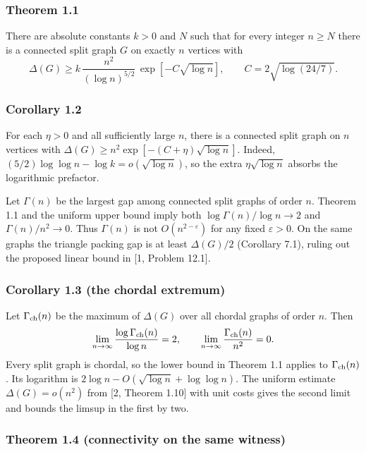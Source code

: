 \documentclass[english,11pt,a4paper]{article}
\begin{document}
\subsubsection{Theorem 1.1}\label{theorem-1.1}

There are absolute constants \(k>0\) and \(N\) such that for every integer \(n\ge N\) there is a connected split graph \(G\) on exactly \(n\) vertices with
\[\Delta(G)\ge k\,\frac{n^2}{(\log n)^{5/2}}\,\exp[-C\sqrt{\log n}],
\qquad C=2\sqrt{\log(24/7)}.\]

\subsubsection{Corollary 1.2}\label{corollary-1.2}

For each \(\eta>0\) and all sufficiently large \(n\), there is a connected split graph on \(n\) vertices with \(\Delta(G)\ge n^2\exp[-(C+\eta)\sqrt{\log n}]\). Indeed, \((5/2)\log\log n-\log k=o(\sqrt{\log n})\), so the extra \(\eta\sqrt{\log n}\) absorbs the logarithmic prefactor.

Let \(\Gamma(n)\) be the largest gap among connected split graphs of order \(n\). Theorem 1.1 and the uniform upper bound imply both \(\log\Gamma(n)/\log n\to2\) and \(\Gamma(n)/n^2\to0\). Thus \(\Gamma(n)\) is not \(O(n^{2-\varepsilon})\) for any fixed \(\varepsilon>0\). On the same graphs the triangle packing gap is at least \(\Delta(G)/2\) (Corollary 7.1), ruling out the proposed linear bound in {[}1, Problem 12.1{]}.

\subsubsection{Corollary 1.3 (the chordal extremum)}\label{corollary-1.3-the-chordal-extremum}

Let \(\Gamma_{\rm ch}(n)\) be the maximum of \(\Delta(G)\) over all chordal graphs of order \(n\). Then \[\lim_{n\to\infty}\frac{\log\Gamma_{\rm ch}(n)}{\log n}=2,\qquad
\lim_{n\to\infty}\frac{\Gamma_{\rm ch}(n)}{n^2}=0.\] Every split graph is chordal, so the lower bound in Theorem 1.1 applies to \(\Gamma_{\rm ch}(n)\). Its logarithm is \(2\log n-O(\sqrt{\log n}+\log\log n)\). The uniform estimate \(\Delta(G)=o(n^2)\) from {[}2, Theorem 1.10{]} with unit costs gives the second limit and bounds the limsup in the first by two.

\subsubsection{Theorem 1.4 (connectivity on the same witness)}\label{theorem-1.4-connectivity-on-the-same-witness}
\end{document}
